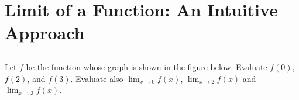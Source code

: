 
\section{Limit of a Function: An Intuitive Approach}

\subsection{} Let $f$ be the function whose graph is shown in the figure below.
	Evaluate $f(0)$, $f(2)$, and $f(3)$. Evaluate also $\lim_{x \to 0} f(x)$,
	$\lim_{x \to 2} f(x)$ and $\lim_{x \to 3} f(x)$.
